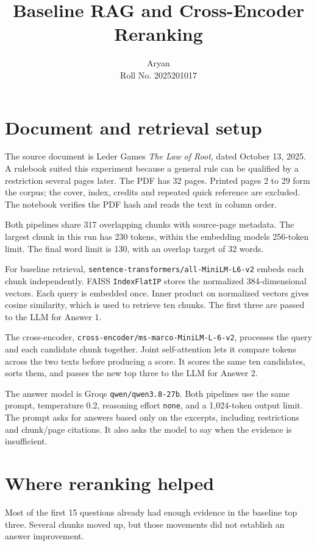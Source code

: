 \documentclass[11pt,a4paper]{article}
\title{Baseline RAG and Cross-Encoder Reranking}
\author{Aryan\\Roll No. 2025201017}
\date{}
\begin{document}
\maketitle

\section{Document and retrieval setup}

The source document is Leder Games\textquotesingle{} \emph{The Law of Root},
dated October 13, 2025. A rulebook suited this experiment because a general
rule can be qualified by a restriction several pages later. The PDF has 32
pages. Printed pages 2 to 29 form the corpus; the cover, index, credits and
repeated quick reference are excluded. The notebook verifies the PDF hash
and reads the text in column order.

Both pipelines share 317 overlapping chunks with source-page metadata.
The largest chunk in this run has 230 tokens, within the embedding
model\textquotesingle{}s 256-token limit. The final word limit is 130, with
an overlap target of 32 words.

For baseline retrieval, \texttt{sentence-transformers/all-MiniLM-L6-v2}
embeds each chunk independently. FAISS \texttt{IndexFlatIP} stores the
normalized 384-dimensional vectors. Each query is embedded once.
Inner product on normalized vectors gives cosine similarity, which is
used to retrieve ten chunks. The first three are passed to the LLM for
Answer 1.

The cross-encoder, \texttt{cross-encoder/ms-marco-MiniLM-L-6-v2}, processes
the query and each candidate chunk together. Joint self-attention lets it
compare tokens across the two texts before producing a score. It scores
the same ten candidates, sorts them, and passes the new top three to the
LLM for Answer 2.

The answer model is Groq\textquotesingle{}s \texttt{qwen/qwen3.8-27b}.
Both pipelines use the same prompt, temperature 0.2, reasoning effort
\texttt{none}, and a 1,024-token output limit. The prompt asks for answers
based only on the excerpts, including restrictions and chunk/page
citations. It also asks the model to say when the evidence is insufficient.

\section{Where reranking helped}

Most of the first 15 questions already had enough evidence in the baseline
top three. Several chunks moved up, but those movements did not establish
an answer improvement.
\end{document}
